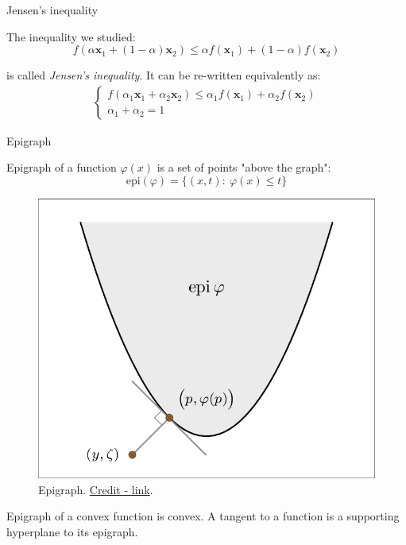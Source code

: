 \documentclass{beamer}
\begin{document}
\begin{frame}{Jensen’s inequality}
	\begin{flushleft}
		
		The inequality we studied:
		\begin{equation}
			f(\alpha \mathbf{x}_1 + (1 - \alpha) \mathbf{x}_2) \leq \alpha f(\mathbf{x}_1) + (1 - \alpha) f(\mathbf{x}_2)
		\end{equation}
		
		is called \emph{Jensen’s inequality}. It can be re-written equivalently as:
		\begin{align}
			\begin{cases}
				f(\alpha_1 \mathbf{x}_1 + \alpha_2 \mathbf{x}_2) \leq \alpha_1 f(\mathbf{x}_1) + \alpha_2 f(\mathbf{x}_2)
				\\
				\alpha_1 + \alpha_2 = 1
			\end{cases}
		\end{align}
		
		
	\end{flushleft}
\end{frame}




\begin{frame}{Epigraph}
	\begin{flushleft}
		
		Epigraph of a function $\varphi(x)$ is a set of points "above the graph":
		\begin{equation}
			\text{epi} (\varphi) = \{ (x, t): \ \varphi(x) \leq t \}
		\end{equation}
		\begin{figure}
			\centering
			\includegraphics[width=0.5\linewidth]{epigraph}
			\caption{Epigraph. \small{\href{https://www.researchgate.net/figure/Projection-onto-the-epigraph-of-a-function-ph-G-0-R_fig1_270905703}{Credit - link}.} }
			\label{fig:epigraph}
		\end{figure}
		
		Epigraph of a convex function is convex. A tangent to a function is a supporting hyperplane to its epigraph.
		
		
	\end{flushleft}
\end{frame}
\end{document}
